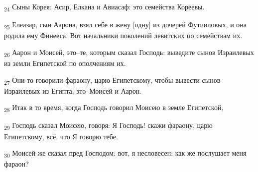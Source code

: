 \begin{tcolorbox}
\textsubscript{24} Сыны Корея: Асир, Елкана и Авиасаф: это семейства Кореевы.
\end{tcolorbox}
\begin{tcolorbox}
\textsubscript{25} Елеазар, сын Аарона, взял себе в жену [одну] из дочерей Футииловых, и она родила ему Финееса. Вот начальники поколений левитских по семействам их.
\end{tcolorbox}
\begin{tcolorbox}
\textsubscript{26} Аарон и Моисей, это--те, которым сказал Господь: выведите сынов Израилевых из земли Египетской по ополчениям их.
\end{tcolorbox}
\begin{tcolorbox}
\textsubscript{27} Они-то говорили фараону, царю Египетскому, чтобы вывести сынов Израилевых из Египта; это--Моисей и Аарон.
\end{tcolorbox}
\begin{tcolorbox}
\textsubscript{28} Итак в то время, когда Господь говорил Моисею в земле Египетской,
\end{tcolorbox}
\begin{tcolorbox}
\textsubscript{29} Господь сказал Моисею, говоря: Я Господь! скажи фараону, царю Египетскому, всё, что Я говорю тебе.
\end{tcolorbox}
\begin{tcolorbox}
\textsubscript{30} Моисей же сказал пред Господом: вот, я несловесен: как же послушает меня фараон?
\end{tcolorbox}
